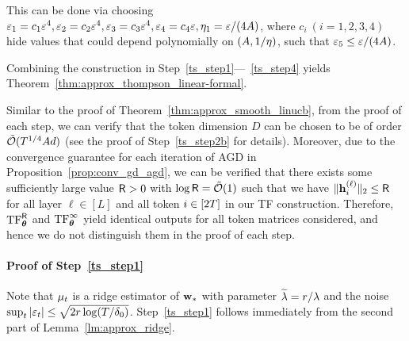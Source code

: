  This can be done via choosing $\varepsilon_1= c_1\varepsilon^4,\varepsilon_2=c_2\varepsilon^4,\varepsilon_3=c_3\varepsilon^4,\varepsilon_4=c_4\varepsilon,{\eta_1}=\varepsilon/(4A)$, where $c_i~(i=1,2,3,4)$  hide values that could depend polynomially on $(A,1/{\eta})$, such that $\varepsilon_5\leq\varepsilon/(4A)$.
 

 
 
 Combining the construction in  Step~\ref{ts_step1}---~\ref{ts_step4} yields Theorem~\ref{thm:approx_thompson_linear-formal}.


 Similar to the proof of Theorem~\ref{thm:approx_smooth_linucb}, from the proof of each step, we can verify that the token dimension $D$ can be chosen to be of order ${\tilde{\mathcal O}}(T^{1/4}Ad)$ (see the proof of Step~\ref{ts_step2b} for details). Moreover, due to the convergence guarantee for each iteration of AGD in Proposition~\ref{prop:conv_gd_agd}, we can be verified that there exists some sufficiently large value ${\mathsf{R}}>0$ with $\log {\mathsf{R}}={\tilde{\mathcal O}}(1)$ such that  we have $\| {\mathbf h}_i^{{(\ell)}} \|_{2} \leq{\mathsf{R}}$
 for all layer $\ell\in[L]$ and all token $i\in[2{T}]$ in our TF construction. Therefore, ${\rm TF}^{\mathsf{R}}_{\boldsymbol \theta}$ and ${\rm TF}^\infty_{\boldsymbol \theta}$ yield identical outputs for all token matrices considered, and hence we do not distinguish them in the proof of each step.






\paragraph{Proof of Step~\ref{ts_step1}} Note that ${{\mathbf\mu}}_t$ is a ridge estimator of ${\mathbf w}_*$ with parameter $\widetilde\lambda={r}/{\lambda}$ and the noise $\sup_t|\varepsilon_t|\leq \sqrt{2{r}\log(T/{\delta_0})}$. Step~\ref{ts_step1} follows immediately  from the second part of Lemma~\ref{lm:approx_ridge}.



